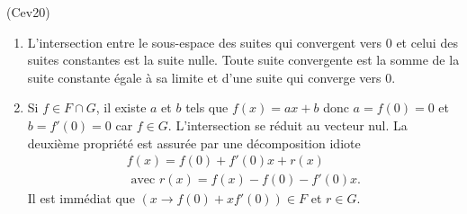 \begin{tiny}(Cev20)\end{tiny}
\begin{enumerate}
 \item L'intersection entre le sous-espace des suites qui convergent vers $0$ et celui des suites constantes est la suite nulle. Toute suite convergente est la somme de la suite constante égale à sa limite et d'une suite qui converge vers $0$.
 \item Si $f\in F \cap G$, il existe $a$ et $b$ tels que $f(x) = ax + b$ donc $a=f(0)=0$ et $b=f'(0)=0$ car $f\in G$. L'intersection se réduit au vecteur nul. La deuxième propriété est assurée par une décomposition idiote
\begin{multline*}
 f(x) = f(0) + f'(0)x + r(x) \\ 
 \text{ avec } r(x) = f(x) -f(0) - f'(0)x.
\end{multline*}
Il est immédiat que $\left( x\rightarrow f(0) + xf'(0)\right)\in F$ et $r\in G$. 
\end{enumerate}
